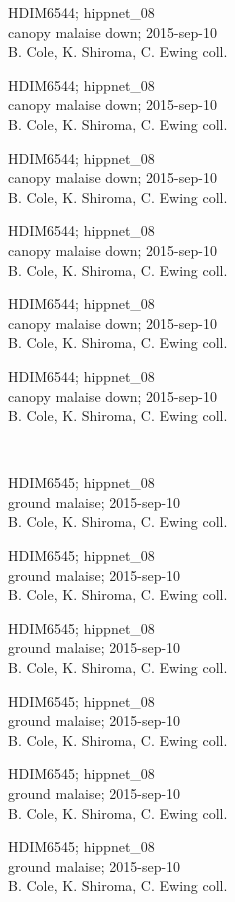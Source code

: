 \documentclass[2pt]{extarticle}
\begin{document}
\noindent
\parbox{0.16\textwidth}{\tiny \raggedright \rule[-0.3\baselineskip]{0pt}{10pt}HDIM6544; hippnet\_08\\ canopy malaise down; 2015-sep-10\\ B. Cole, K. Shiroma, C. Ewing coll.}
\parbox{0.16\textwidth}{\tiny \raggedright \rule[-0.3\baselineskip]{0pt}{10pt}HDIM6544; hippnet\_08\\ canopy malaise down; 2015-sep-10\\ B. Cole, K. Shiroma, C. Ewing coll.}
\parbox{0.16\textwidth}{\tiny \raggedright \rule[-0.3\baselineskip]{0pt}{10pt}HDIM6544; hippnet\_08\\ canopy malaise down; 2015-sep-10\\ B. Cole, K. Shiroma, C. Ewing coll.}
\parbox{0.16\textwidth}{\tiny \raggedright \rule[-0.3\baselineskip]{0pt}{10pt}HDIM6544; hippnet\_08\\ canopy malaise down; 2015-sep-10\\ B. Cole, K. Shiroma, C. Ewing coll.}
\parbox{0.16\textwidth}{\tiny \raggedright \rule[-0.3\baselineskip]{0pt}{10pt}HDIM6544; hippnet\_08\\ canopy malaise down; 2015-sep-10\\ B. Cole, K. Shiroma, C. Ewing coll.}
\parbox{0.16\textwidth}{\tiny \raggedright \rule[-0.3\baselineskip]{0pt}{10pt}HDIM6544; hippnet\_08\\ canopy malaise down; 2015-sep-10\\ B. Cole, K. Shiroma, C. Ewing coll.} \\ 
\vspace{0.001in} 

\noindent
\parbox{0.16\textwidth}{\tiny \raggedright \rule[-0.3\baselineskip]{0pt}{10pt}HDIM6545; hippnet\_08\\ ground malaise; 2015-sep-10\\ B. Cole, K. Shiroma, C. Ewing coll.}
\parbox{0.16\textwidth}{\tiny \raggedright \rule[-0.3\baselineskip]{0pt}{10pt}HDIM6545; hippnet\_08\\ ground malaise; 2015-sep-10\\ B. Cole, K. Shiroma, C. Ewing coll.}
\parbox{0.16\textwidth}{\tiny \raggedright \rule[-0.3\baselineskip]{0pt}{10pt}HDIM6545; hippnet\_08\\ ground malaise; 2015-sep-10\\ B. Cole, K. Shiroma, C. Ewing coll.}
\parbox{0.16\textwidth}{\tiny \raggedright \rule[-0.3\baselineskip]{0pt}{10pt}HDIM6545; hippnet\_08\\ ground malaise; 2015-sep-10\\ B. Cole, K. Shiroma, C. Ewing coll.}
\parbox{0.16\textwidth}{\tiny \raggedright \rule[-0.3\baselineskip]{0pt}{10pt}HDIM6545; hippnet\_08\\ ground malaise; 2015-sep-10\\ B. Cole, K. Shiroma, C. Ewing coll.}
\parbox{0.16\textwidth}{\tiny \raggedright \rule[-0.3\baselineskip]{0pt}{10pt}HDIM6545; hippnet\_08\\ ground malaise; 2015-sep-10\\ B. Cole, K. Shiroma, C. Ewing coll.} \\ 
\vspace{0.001in} 
\end{document}
